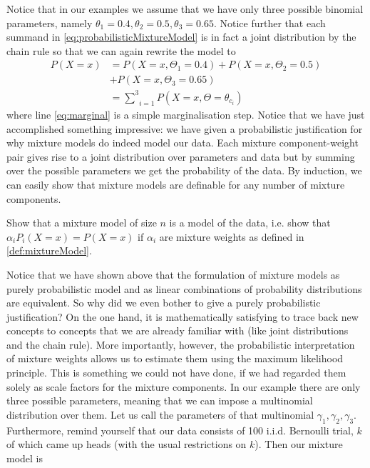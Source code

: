 Notice that in our examples we assume that we have only three possible binomial parameters, namely $ \theta_{1} = 0.4, \theta_{2} = 0.5, \theta_{3} = 0.65 $. 
Notice further that each summand
in \eqref{eq:probabilisticMixtureModel} is in fact a joint distribution by the chain rule so that we can again rewrite the model to
\begin{align}
P(X=x) &= P(X=x,\Theta_{1}=0.4) + P(X=x,\Theta_{2}=0.5) \\
&+ P(X=x,\Theta_{3}=0.65) \nonumber \\
&= \underset{i=1}{\overset{3}{{\sum}}} P(X=x,\Theta=\theta_{c_{i}}) \label{eq:marginal}
\end{align}
where line \eqref{eq:marginal} is a simple marginalisation step. Notice that we have just accomplished something impressive: we have given a probabilistic justification
for why mixture models do indeed model our data. Each mixture component-weight pair gives rise to a joint distribution over parameters and data but by summing over the 
possible parameters we get the probability of the data. By induction, we can easily show that mixture models are definable for any number of mixture components.

\begin{Exercise}
Show that a mixture model of size $ n $ is a model of the data, i.e. show that $  \alpha_{i}P_{i}(X=x) = P(X=x) $ if $ \alpha_{i} $ are mixture weights as 
defined in \ref{def:mixtureModel}.
\end{Exercise}

Notice that we have shown above that the formulation of mixture models as purely probabilistic model and as linear combinations of probability distributions are
equivalent. So why did we even bother to give a purely probabilistic justification? On the one hand, it is mathematically satisfying to trace back new concepts
to concepts that we are already familiar with (like joint distributions and the chain rule). More importantly, however, the probabilistic interpretation of mixture
weights allows us to estimate them using the maximum likelihood principle. This is something we could not have done, if we had regarded them solely as scale factors
for the mixture components. In our example there are only three possible parameters, meaning that we can impose a multinomial distribution over them. Let us
call the parameters of that multinomial $ \gamma_{1}, \gamma_{2}, \gamma_{3} $. Furthermore, remind yourself that our data consists of 100 i.i.d. Bernoulli
trial, $ k $ of which came up heads (with the usual restrictions on $ k $). Then our mixture model is

